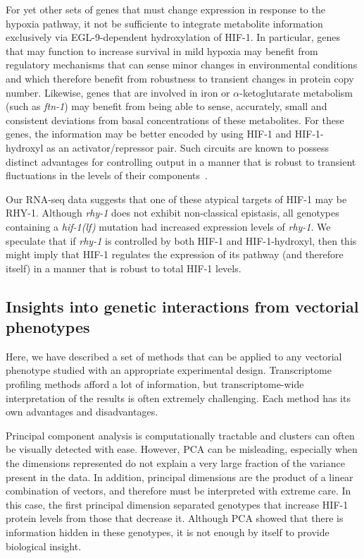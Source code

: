 \documentclass[9pt,twocolumn,twoside]{pnas-new}
\newcommand{\gene}[1]{\mbox{\emph{#1}}}
\newcommand{\ftna}{\gene{ftn-1}}
\newcommand{\hif}{\gene{hif-1(lf)}}
\newcommand{\eglp}{EGL-9}
\newcommand{\rhyp}{RHY-1}
\newcommand{\hifp}{HIF-1}
\begin{document}
For yet other sets of genes that must change expression in response to the
hypoxia pathway, it not be sufficiente to integrate metabolite
information exclusively via \eglp{}-dependent hydroxylation of \hifp{}. In
particular, genes that may function to increase survival in mild hypoxia may
benefit from regulatory mechanisms that can sense minor changes in environmental
conditions and which therefore benefit from robustness to transient changes in
protein copy number. Likewise, genes that are involved in iron or
$\alpha$-ketoglutarate metabolism (such as \ftna{}) may benefit from being able
to sense, accurately, small and consistent deviations from basal concentrations
of these metabolites. For these genes, the information may be better encoded by
using \hifp{} and \hifp{}-hydroxyl as an activator/repressor pair. Such circuits
are known to possess distinct advantages for controlling output in a manner that
is robust to transient fluctuations in the levels of their
components~\cite{Hart2012,Hart2013}.

Our RNA-seq data suggests that one of these atypical targets of \hifp{} may be
\rhyp{}. Although \gene{rhy-1} does not exhibit non-classical epistasis, all
genotypes containing a \hif{} mutation had increased expression levels of
\gene{rhy-1}. We speculate that if \gene{rhy-1} is controlled by both \hifp{}
and \hifp{}-hydroxyl, then this might imply that \hifp{} regulates the
expression of its pathway (and therefore itself) in a manner that is robust to
total \hifp{} levels.

\subsection*{Insights into genetic interactions from vectorial phenotypes}
Here, we have described a set of methods that can be  applied to any vectorial
phenotype studied with an appropriate experimental design. Transcriptome
profiling methods afford a lot of information, but transcriptome-wide
interpretation of the results is often extremely challenging. Each method has
its own advantages and disadvantages.

Principal component analysis is computationally tractable and clusters can often
be visually detected with ease. However, PCA can be misleading, especially when
the dimensions represented do not explain a very large fraction of the variance
present in the data. In addition, principal dimensions are the product of a
linear combination of vectors, and therefore must be interpreted with extreme
care. In this case, the first principal dimension separated genotypes that
increase \hifp{} protein levels from those that decrease it. Although PCA showed
that there is information hidden in these genotypes, it is not enough by itself
to provide biological insight.
\end{document}
